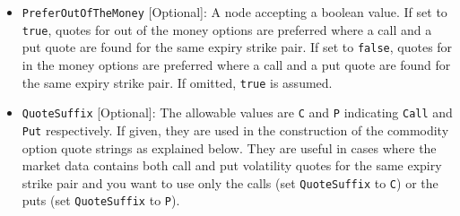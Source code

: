 \begin{itemize}
\item \lstinline!PreferOutOfTheMoney! [Optional]:
A node accepting a boolean value. If set to \lstinline!true!, quotes for out of the money options are preferred where a call and a put quote are found for the same expiry strike pair. If set to \lstinline!false!, quotes for in the money options are preferred where a call and a put quote are found for the same expiry strike pair. If omitted, \lstinline!true! is assumed.

\item \lstinline!QuoteSuffix! [Optional]:
The allowable values are \lstinline!C! and \lstinline!P! indicating \lstinline!Call! and \lstinline!Put! respectively. If given, they are used in the construction of the commodity option quote strings as explained below. They are useful in cases where the market data contains both call and put volatility quotes for the same expiry strike pair and you want to use only the calls (set \lstinline!QuoteSuffix! to \lstinline!C!) or the puts (set \lstinline!QuoteSuffix! to \lstinline!P!).

\end{itemize}

